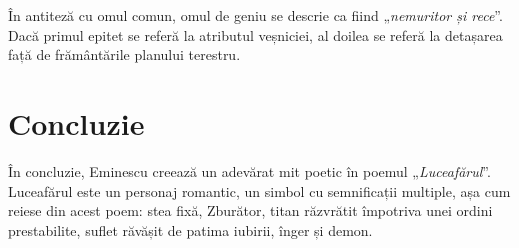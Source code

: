 \documentclass{article}
\newcommand{\qu}[1]{„\emph{#1}”}
\begin{document}
În antiteză cu omul comun, omul de geniu se descrie ca fiind \qu{nemuritor și rece}. Dacă primul epitet se referă la atributul veșniciei, al doilea se referă la detașarea față de frământările planului terestru.
\section{Concluzie}
În concluzie, Eminescu creează un adevărat mit poetic în poemul \qu{Luceafărul}. Luceafărul este un personaj romantic, un simbol cu semnificații multiple, așa cum reiese din acest poem: stea fixă, Zburător, titan răzvrătit împotriva unei ordini prestabilite, suflet răvășit de patima iubirii, înger și demon.
\end{document}
